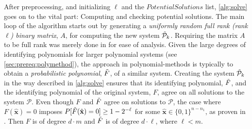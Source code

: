 After preprocessing, and initializing $\ell$ and the $PotentialSolutions$ list, \cref{alg:solve} goes on to the vital part: Computing and checking potential solutions. The main loop of the algorithm starts out by generating a \textit{uniformly random full rank (rank $\ell$) binary matrix}, $A$, for computing the new system $\Tilde{\mathcal{P}}_k$. Requiring the matrix $A$ to be full rank was merely done in \cite{eurocrypt-2021-30841} for ease of analysis. Given the large degrees of identifying polynomials for larger polynomial systems (see \cref{sec:prereq:polymethod}), the approach in polynomial-methods is typically to obtain a \textit{probabilistic polynomial}, $\Tilde{F}$, of a similar system. Creating the system $\Tilde{\mathcal{P}}_k$ in the way described in \cref{alg:solve} ensures that its identifying polynomial, $\Tilde{F}$, and the identifying polynomial of the original system, $F$, agree on all solutions to the system $\mathcal{P}$. Even though $F$ and $\Tilde{F}$ agree on solutions to $\mathcal{P}$, the case where $F(\hat{\mathbf{x}}) = 0$ imposes $P[\Tilde{F}(\hat{\mathbf{x}}) = 0] \geq 1 - 2^{-\ell}$ for some $\hat{\mathbf{x}} \in \{0,1\}^{n - n_1}$, as proven in \cite{eurocrypt-2021-30841}. Then $F$ is of degree $d \cdot m$ and $\Tilde{F}$ is of degree $d \cdot \ell$, where $\ell < m$.

